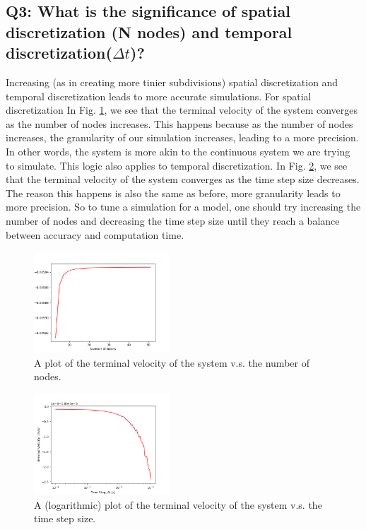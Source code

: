 \documentclass[letterpaper, 10 pt, conference]{ieeeconf}  %
\begin{document}
\subsection*{Q3: What is the significance of spatial discretization (N nodes) and temporal discretization($\Delta t$)? }

Increasing (as in creating more tinier subdivisions) spatial discretization and temporal discretization leads to more accurate simulations. For spatial discretization In Fig. \ref{"fig:p2q3_spatial"}, we see that the terminal velocity of the system converges as the number of nodes increases. This happens because as the number of nodes increases, the granularity of our simulation increases, leading to a more precision. In other words, the system is more akin to the continuous system we are trying to simulate. This logic also applies to temporal discretization. In Fig. \ref{"fig:p2q3_temporal"}, we see that the terminal velocity of the system converges as the time step size decreases. The reason this happens is also the same as before, more granularity leads to more precision. So to tune a simulation for a model, one should try increasing the number of nodes and decreasing the time step size until they reach a balance between accuracy and computation time.

\begin{figure}[!ht]
        \centering
        \includegraphics[width=0.45\textwidth,keepaspectratio]{p2q3_implicit_vterm_vs_nodes.png}
        \caption{A plot of the terminal velocity of the system v.s. the number of nodes.}
        \label{"fig:p2q3_spatial"}
\end{figure}

\begin{figure}[!ht]
        \centering
        \includegraphics[width=0.45\textwidth,keepaspectratio]{p2q3_implicit_vterm_vs_dt.png}
        \caption{A (logarithmic) plot of the terminal velocity of the system v.s. the time step size.}
        \label{"fig:p2q3_temporal"}
\end{figure}
\end{document}
